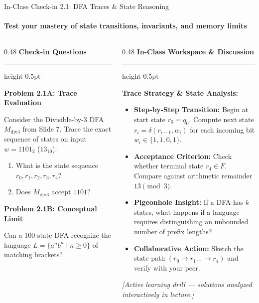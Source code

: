 \documentclass[aspectratio=169, 10pt]{beamer}
\newcommand{\colheader}[1]{%
  {\noindent\footnotesize\bfseries\color{gimpanavy}#1}%
  \vspace{0.02cm}%
  {\color{gimpanavy!30}\hrule height 0.5pt}%
  \vspace{0.05cm}%
}
\newcommand{\cardtitle}[1]{{\noindent\footnotesize\bfseries\color{gimpanavy}#1}\par\vspace{0.03cm}}
\newcommand{\ambertitle}[1]{{\noindent\footnotesize\bfseries\color{accentAmber}#1}\par\vspace{0.03cm}}
\begin{document}
\begin{frame}{In-Class Check-in 2.1: DFA Traces \& State Reasoning}
  \framesubtitle{Test your mastery of state transitions, invariants, and memory limits}
  
  \begin{columns}[T]
    \begin{column}{0.48\textwidth}
      \colheader{Check-in Questions}
      \begin{tcolorbox}[quizcard]
        \ambertitle{Problem 2.1A: Trace Evaluation}
        {\scriptsize
        Consider the Divisible-by-3 DFA $M_{\text{div3}}$ from Slide 7. Trace the exact sequence of states on input $w = 1101_2$ ($13_{10}$):
        \begin{enumerate}\setlength{\itemsep}{1.5pt}\scriptsize
          \item What is the state sequence $r_0, r_1, r_2, r_3, r_4$?
          \item Does $M_{\text{div3}}$ accept $1101$?
        \end{enumerate}
        }
        \vspace{0.06cm}
        
        \ambertitle{Problem 2.1B: Conceptual Limit}
        {\scriptsize
        Can a 100-state DFA recognize the language $L = \{a^n b^n \mid n \ge 0\}$ of matching brackets?
        }
      \end{tcolorbox}
    \end{column}
    
    \begin{column}{0.48\textwidth}
      \colheader{In-Class Workspace \& Discussion}
      \begin{tcolorbox}[conceptcard]
        \cardtitle{Trace Strategy \& State Analysis:}
        \begin{itemize}\setlength{\itemsep}{3pt}\scriptsize
          \item \textbf{Step-by-Step Transition:} Begin at start state $r_0 = q_0$. Compute next state $r_i = \delta(r_{i-1}, w_i)$ for each incoming bit $w_i \in \{1, 1, 0, 1\}$.
          \item \textbf{Acceptance Criterion:} Check whether terminal state $r_4 \in F$. Compare against arithmetic remainder $13 \pmod 3$.
          \item \textbf{Pigeonhole Insight:} If a DFA has $k$ states, what happens if a language requires distinguishing an unbounded number of prefix lengths?
          \item \textbf{Collaborative Action:} Sketch the state path $(r_0 \to r_1 \dots \to r_4)$ and verify with your peer.
        \end{itemize}
        \vspace{0.20cm}
        {\tiny\color{charcoalText}\textit{[Active learning drill --- solutions analyzed interactively in lecture.]}}
      \end{tcolorbox}
    \end{column}
  \end{columns}
\end{frame}
\end{document}
